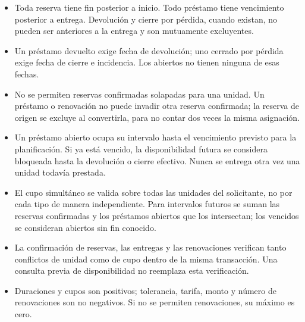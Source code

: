 \begin{itemize}
    \item Toda reserva tiene fin posterior a inicio. Todo pr\'estamo tiene vencimiento posterior a entrega. Devoluci\'on y cierre por p\'erdida, cuando existan, no pueden ser anteriores a la entrega y son mutuamente excluyentes.
    \item Un pr\'estamo devuelto exige fecha de devoluci\'on; uno cerrado por p\'erdida exige fecha de cierre e incidencia. Los abiertos no tienen ninguna de esas fechas.
    \item No se permiten reservas confirmadas solapadas para una unidad. Un pr\'estamo o renovaci\'on no puede invadir otra reserva confirmada; la reserva de origen se excluye al convertirla, para no contar dos veces la misma asignaci\'on.
    \item Un pr\'estamo abierto ocupa su intervalo hasta el vencimiento previsto para la planificaci\'on. Si ya est\'a vencido, la disponibilidad futura se considera bloqueada hasta la devoluci\'on o cierre efectivo. Nunca se entrega otra vez una unidad todav\'ia prestada.
    \item El cupo simult\'aneo se valida sobre todas las unidades del solicitante, no por cada tipo de manera independiente. Para intervalos futuros se suman las reservas confirmadas y los pr\'estamos abiertos que los intersectan; los vencidos se consideran abiertos sin fin conocido.
    \item La confirmaci\'on de reservas, las entregas y las renovaciones verifican tanto conflictos de unidad como de cupo dentro de la misma transacci\'on. Una consulta previa de disponibilidad no reemplaza esta verificaci\'on.
    \item Duraciones y cupos son positivos; tolerancia, tarifa, monto y n\'umero de renovaciones son no negativos. Si no se permiten renovaciones, su m\'aximo es cero.
\end{itemize}

